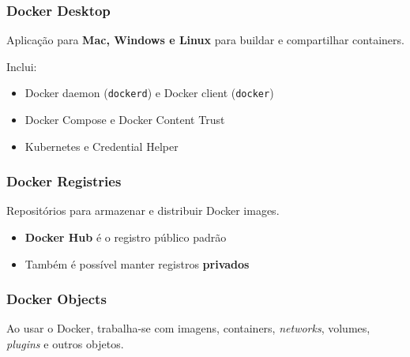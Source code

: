 \begin{frame}
  \frametitle{Docker Desktop}
  Aplicação para \textbf{Mac, Windows e Linux} para buildar e compartilhar containers.

  \vspace{0.5em}
  Inclui:
  \begin{itemize}
    \item Docker daemon (\texttt{dockerd}) e Docker client (\texttt{docker})
    \item Docker Compose e Docker Content Trust
    \item Kubernetes e Credential Helper
  \end{itemize}
\end{frame}


\begin{frame}
  \frametitle{Docker Registries}
    Repositórios para armazenar e distribuir Docker images.

  \vspace{0.5em}
  \begin{itemize}
    \item \textbf{Docker Hub} é o registro público padrão
    \item Também é possível manter registros \textbf{privados}
  \end{itemize}

  \vspace{0.5em}
\end{frame}


\begin{frame}
  \frametitle{Docker Objects}
  Ao usar o Docker, trabalha-se com imagens, containers, \textit{networks},
  volumes, \textit{plugins} e outros objetos.
\end{frame}

